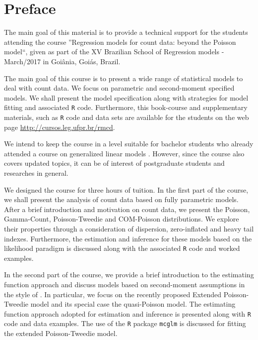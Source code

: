 \documentclass[9pt,a5paper,]{book}
\theoremstyle{definition}
\theoremstyle{definition}
\theoremstyle{remark}
\begin{document}
\clearpage
\thispagestyle{empty}
\pagebreak

\setcounter{page}{1}

{
\setcounter{tocdepth}{1}
\tableofcontents
}
\chapter*{Preface}\label{preface}

The main goal of this material is to provide a technical support for the
students attending the course ''Regression models for count data: beyond
the Poisson model``, given as part of the XV Brazilian School of
Regression models - March/2017 in Goiânia, Goiás, Brazil.

The main goal of this course is to present a wide range of statistical
models to deal with count data. We focus on parametric and second-moment
specified models. We shall present the model specification along with
strategies for model fitting and associated \texttt{R}\citep{R2015}
code. Furthermore, this book-course and supplementary materials, such as
\texttt{R} code and data sets are available for the students on the web
page \url{http://cursos.leg.ufpr.br/rmcd}.

We intend to keep the course in a level suitable for bachelor students
who already attended a course on generalized linear models
\citep{Nelder1972}. However, since the course also covers updated
topics, it can be of interest of postgraduate students and researches in
general.

We designed the course for three hours of tuition. In the first part of
the course, we shall present the analysis of count data based on fully
parametric models. After a brief introduction and motivation on count
data, we present the Poisson, Gamma-Count, Poisson-Tweedie and
COM-Poisson distributions. We explore their properties through a
consideration of dispersion, zero-inflated and heavy tail indexes.
Furthermore, the estimation and inference for these models based on the
likelihood paradigm is discussed along with the associated \texttt{R}
code and worked examples.

In the second part of the course, we provide a brief introduction to the
estimating function approach \citetext{\citealp[
]{Jorgensen2004}; \citealp{Bonat2016a}} and discuss models based on
second-moment assumptions in the style of \citet{Wedderburn1974}. In
particular, we focus on the recently proposed Extended Poisson-Tweedie
model \citep{Bonat2016b} and its special case the quasi-Poisson model.
The estimating function approach adopted for estimation and inference is
presented along with \texttt{R} code and data examples. The use of the
\texttt{R} package \texttt{mcglm} \citep{Bonat2016c} is discussed for
fitting the extended Poisson-Tweedie model.
\end{document}
